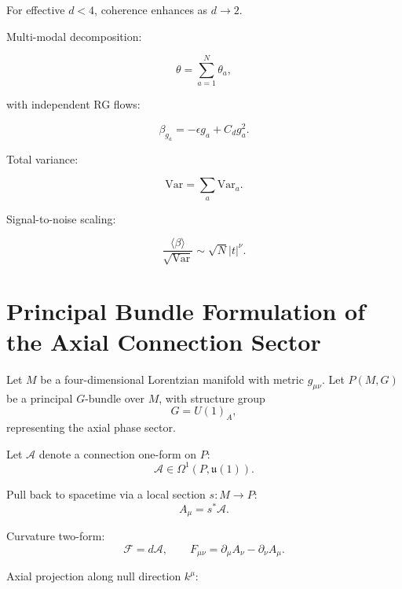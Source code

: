 \documentclass[12pt]{article}
\begin{document}
For effective $d<4$, coherence enhances as $d \rightarrow 2$.

Multi-modal decomposition:

\begin{equation}
\theta
=
\sum_{a=1}^N \theta_a,
\end{equation}

with independent RG flows:

\begin{equation}
\beta_{g_a}
=
-\epsilon g_a + C_d g_a^2.
\end{equation}

Total variance:

\begin{equation}
\mathrm{Var}
=
\sum_a \mathrm{Var}_a.
\end{equation}

Signal-to-noise scaling:

\begin{equation}
\frac{\langle \beta \rangle}{\sqrt{\mathrm{Var}}}
\sim
\sqrt{N}
|t|^{\nu}.
\end{equation}

\section{Principal Bundle Formulation of the Axial Connection Sector}

Let $M$ be a four-dimensional Lorentzian manifold with metric $g_{\mu\nu}$.
Let $P(M,G)$ be a principal $G$-bundle over $M$, with structure group
\begin{equation}
G = U(1)_A,
\end{equation}
representing the axial phase sector.

Let $\mathcal{A}$ denote a connection one-form on $P$:
\begin{equation}
\mathcal{A} \in \Omega^1(P,\mathfrak{u}(1)).
\end{equation}

Pull back to spacetime via a local section $s: M \to P$:
\begin{equation}
A_\mu = s^\ast \mathcal{A}.
\end{equation}

Curvature two-form:
\begin{equation}
\mathcal{F} = d\mathcal{A},
\qquad
F_{\mu\nu} = \partial_\mu A_\nu - \partial_\nu A_\mu.
\end{equation}

Axial projection along null direction $k^\mu$:
\end{document}

